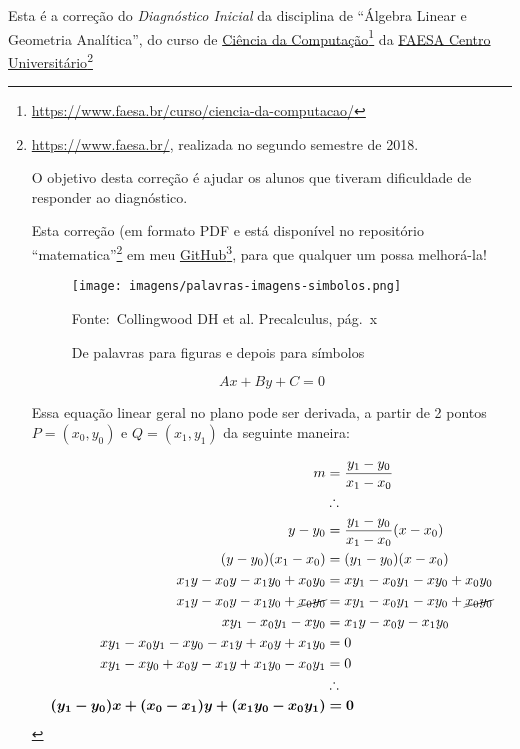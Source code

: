 \documentclass[pdftex, brazil, 12pt, oneside]{article}
\begin{document}
Esta é a correção do \emph{Diagnóstico Inicial} da disciplina de
``Álgebra Linear e Geometria Analítica'', do curso de
\href{https://www.faesa.br/curso/ciencia-da-computacao/}{Ciência da Computação}\footnote{
  \url{https://www.faesa.br/curso/ciencia-da-computacao/}}
da \href{https://www.faesa.br/}{FAESA Centro Universitário}\footnote{
  \url{https://www.faesa.br/}, realizada no segundo semestre de 2018.

O objetivo desta correção é ajudar os alunos que tiveram dificuldade de responder
ao diagnóstico.

Esta correção (em formato PDF e \LaTeXe\) está disponível no repositório ``matematica''\footnote{
  Mais especificamente em: }
em meu \href{https://github.com/abrantesasf/matematica}{GitHub}\footnote{
  \url{https://github.com/abrantesasf/matematica}}, para que qualquer um possa melhorá-la!

\begin{figure}[ht]
  \begin{center}
    \caption{De palavras para figuras e depois para símbolos}
    \label{fig:palavras-imagens-simbolos}
    \texttt{[image: imagens/palavras-imagens-simbolos.png]}
    
    \footnotesize{Fonte:~Collingwood DH et al. Precalculus, pág.\ x}
  \end{center}
\end{figure}


\begin{equation}
  Ax + By + C = 0
\end{equation}

Essa equação linear geral no plano pode ser derivada,
a partir de 2 pontos $P=(x_0, y_0)$ e $Q=(x_1, y_1)$ da seguinte maneira:

\begin{equation}
  \begin{split}
    m & = \frac{y_1 - y_0}{x_1 - x_0}\\
      & \therefore\\
    y - y_0 & = \frac{y_1 - y_0}{x_1 - x_0}(x - x_0)\\
    (y - y_0)(x_1 - x_0) & = (y_1 - y_0)(x - x_0)\\
    x_1y - x_0y - x_1y_0 + x_0y_0 & = xy_1 - x_0y_1 - xy_0 + x_0y_0\\
    x_1y - x_0y - x_1y_0 + \cancel{x_0y_0} & = xy_1 - x_0y_1 - xy_0 + \cancel{x_0y_0}\\
    xy_1 - x_0y_1 - xy_0 & = x_1y - x_0y - x_1y_0\\
    xy_1 - x_0y_1 - xy_0 - x_1y + x_0y + x_1y_0 & = 0\\
    xy_1 - xy_0 + x_0y - x_1y + x_1y_0 - x_0y_1 & = 0\\
    & \therefore\\
    \bm{(y_1 - y_0)x + (x_0 - x_1)y + (x_1y_0 - x_0y_1)} &\bm{= 0}
  \end{split}
\end{equation}


}
\end{document}
